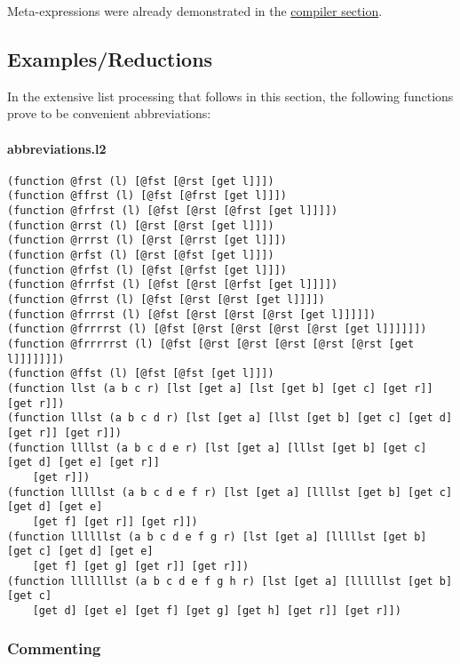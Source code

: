 \documentclass[]{article}
\let\oldparagraph\paragraph
\renewcommand{\paragraph}[1]{\oldparagraph{#1}\mbox{}}
\begin{document}
Meta-expressions were already demonstrated in the
\protect\hyperlink{the-compiler}{compiler section}.

\hypertarget{examplesux2freductions}{%
\subsection{Examples/Reductions}\label{examplesux2freductions}}

In the extensive list processing that follows in this section, the
following functions prove to be convenient abbreviations:

\hypertarget{abbreviations.l2}{%
\paragraph{abbreviations.l2}\label{abbreviations.l2}}

\begin{verbatim}
(function @frst (l) [@fst [@rst [get l]]])
(function @ffrst (l) [@fst [@frst [get l]]])
(function @frfrst (l) [@fst [@rst [@frst [get l]]]])
(function @rrst (l) [@rst [@rst [get l]]])
(function @rrrst (l) [@rst [@rrst [get l]]])
(function @rfst (l) [@rst [@fst [get l]]])
(function @frfst (l) [@fst [@rfst [get l]]])
(function @frrfst (l) [@fst [@rst [@rfst [get l]]]])
(function @frrst (l) [@fst [@rst [@rst [get l]]]])
(function @frrrst (l) [@fst [@rst [@rst [@rst [get l]]]]])
(function @frrrrst (l) [@fst [@rst [@rst [@rst [@rst [get l]]]]]])
(function @frrrrrst (l) [@fst [@rst [@rst [@rst [@rst [@rst [get l]]]]]]])
(function @ffst (l) [@fst [@fst [get l]]])
(function llst (a b c r) [lst [get a] [lst [get b] [get c] [get r]] [get r]])
(function lllst (a b c d r) [lst [get a] [llst [get b] [get c] [get d] [get r]] [get r]])
(function llllst (a b c d e r) [lst [get a] [lllst [get b] [get c] [get d] [get e] [get r]]
    [get r]])
(function lllllst (a b c d e f r) [lst [get a] [llllst [get b] [get c] [get d] [get e]
    [get f] [get r]] [get r]])
(function llllllst (a b c d e f g r) [lst [get a] [lllllst [get b] [get c] [get d] [get e]
    [get f] [get g] [get r]] [get r]])
(function lllllllst (a b c d e f g h r) [lst [get a] [llllllst [get b] [get c]
    [get d] [get e] [get f] [get g] [get h] [get r]] [get r]])
\end{verbatim}

\hypertarget{commenting}{%
\subsubsection{Commenting}\label{commenting}}
\end{document}
